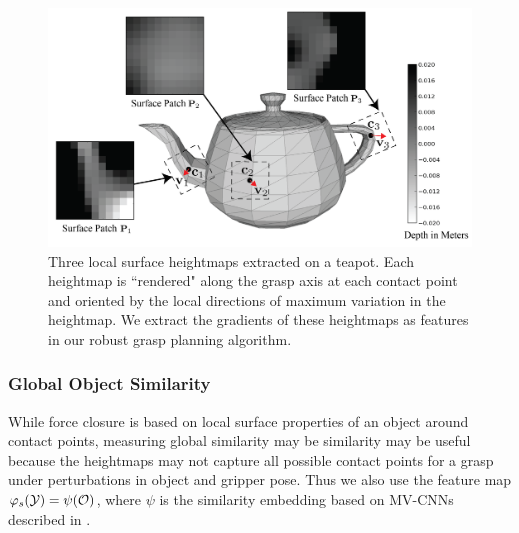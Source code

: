 \begin{figure}[t!]
\centering
\includegraphics[scale=0.35]{figures/illustrations/local_feature_model.png}
\caption{Three local surface heightmaps extracted on a teapot. Each heightmap is ``rendered" along the grasp axis at each contact point and oriented by the local directions of maximum variation in the heightmap.  We extract the gradients of these heightmaps as features in our robust grasp planning algorithm.}
\vspace*{-15pt}
\end{figure}

\subsubsection{Global Object Similarity}
While force closure is based on local surface properties of an object around contact points, measuring global similarity may be similarity may be useful because the heightmaps may not capture all possible contact points for a grasp under perturbations in object and gripper pose.
Thus we also use the feature map $\varphi_{s}(\mathcal{Y}) = \psi(\mathcal{O})$, where $\psi$ is the similarity embedding based on MV-CNNs described in .

%
 
